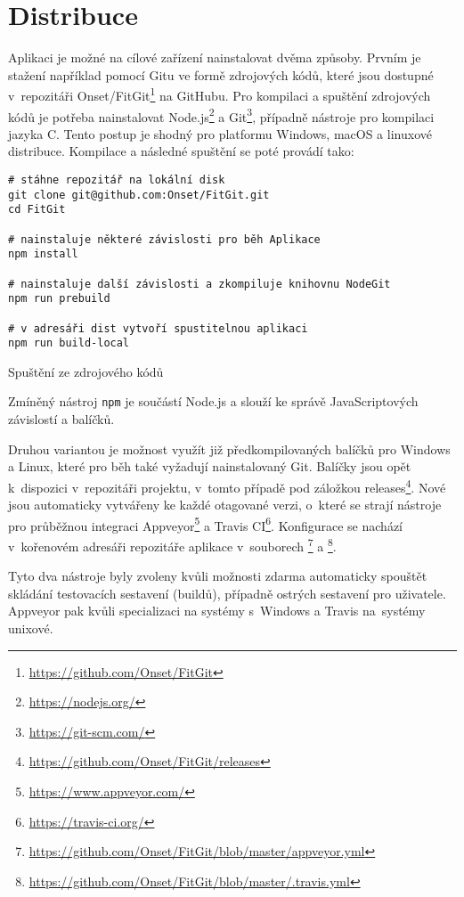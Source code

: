 \chapter{Distribuce}

Aplikaci je možné na cílové zařízení nainstalovat dvěma způsoby. Prvním je stažení například pomocí Gitu ve formě zdrojových kódů, které jsou dostupné v~repozitáři Onset/FitGit\footnote{\url{https://github.com/Onset/FitGit}} na GitHubu. Pro kompilaci a spuštění zdrojových kódů je potřeba nainstalovat Node.js\footnote{\url{https://nodejs.org/}} a Git\footnote{\url{https://git-scm.com/}}, případně nástroje pro kompilaci jazyka C. Tento postup je shodný pro platformu Windows, macOS a linuxové distribuce. Kompilace a následné spuštění se poté provádí tako:

\FloatBarrier
\begin{listing}[ht]
	\begin{verbatim}
# stáhne repozitář na lokální disk
git clone git@github.com:Onset/FitGit.git
cd FitGit

# nainstaluje některé závislosti pro běh Aplikace
npm install

# nainstaluje další závislosti a zkompiluje knihovnu NodeGit
npm run prebuild

# v adresáři dist vytvoří spustitelnou aplikaci
npm run build-local
	\end{verbatim}
	\caption{Spuštění ze zdrojového kódů}
\end{listing}
\FloatBarrier

Zmíněný nástroj \texttt{npm} je součástí Node.js a slouží ke správě JavaScriptových závislostí a balíčků.

Druhou variantou je možnost využít již předkompilovaných balíčků pro Windows a Linux, které pro běh také vyžadují nainstalovaný Git. Balíčky jsou opět k~dispozici v~repozitáři projektu, v~tomto případě pod záložkou releases\footnote{\url{https://github.com/Onset/FitGit/releases}}. Nové jsou automaticky vytvářeny ke každé otagované verzi, o~které se strají nástroje pro průběžnou integraci Appveyor\footnote{\url{https://www.appveyor.com/}} a Travis CI\footnote{\url{https://travis-ci.org/}}. Konfigurace se nachází v~kořenovém adresáři repozitáře aplikace v~souborech \footnote{\url{https://github.com/Onset/FitGit/blob/master/appveyor.yml}} a \footnote{\url{https://github.com/Onset/FitGit/blob/master/.travis.yml}}.

Tyto dva nástroje byly zvoleny kvůli možnosti zdarma automaticky spouštět skládání testovacích sestavení (buildů), případně ostrých sestavení pro uživatele. Appveyor pak kvůli specializaci na systémy s~Windows a Travis na~systémy unixové.

